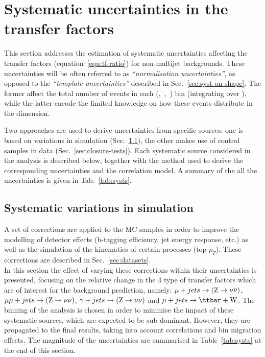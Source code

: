 \clearpage
\section{Systematic uncertainties in the transfer factors}
\label{sec:systematics}

This section addresses the estimation of systematic uncertainties
affecting the transfer factors (equation~\ref{equ:tf-ratio})
for non-multijet backgrounds. 
These uncertainties will be often referred to as \textit{``normalisation uncertainties''}, 
as opposed to the \textit{``template uncertainties''} described in Sec.~\ref{sec:syst-on-shape}. 
The former affect the total number of events in each (\njet,~\nb,~\scalht) bin (integrating over \mht), 
while the latter encode the limited knowledge on how these events distribute in the \mht dimension.

Two approaches are used to derive uncertainties from specific sources:
one is based on variations in simulation (Sec.~\ref{sec:mc-variations}), the other makes use of control samples in data (Sec.~\ref{sec:closure-tests}).
Each systematic source considered in the analysis is described below, 
together with the method used to derive the corresponding uncertainties and the correlation model. 
A summary of the all the uncertainties is given in Tab.~\ref{tab:systs}.

\subsection{Systematic variations in simulation}
\label{sec:mc-variations}

A set of corrections are applied to the MC samples in order to improve the modelling 
of detector effects (b-tagging efficiency, jet energy response, etc.) 
as well as the simulation of the kinematics of certain processes (top $p_{T}$). 
These corrections are described in Sec.~\ref{sec:datasets}. \\
In this section the effect of varying these corrections within their uncertainties is 
presented, focusing on the relative change in the 4 type of transfer factors which are of interest 
for the background prediction, namely: $\mu + jets \rightarrow ({\text Z} \rightarrow \nu\bar{\nu})$,
$\mu\mu + jets \rightarrow ({\text Z} \rightarrow \nu\bar{\nu})$, $\gamma + jets \rightarrow ({\text Z} \rightarrow \nu\bar{\nu})$ and $\mj
\rightarrow \mathrm{\ttbar+W}$. 
The binning of the analysis is chosen in order to minimise the impact of 
these systematic sources, which are expected to be sub-dominant. 
However, they are propagated to the final results, taking into account
correlations and bin migration effects. 
The magnitude of the uncertainties are summarised in Table~\ref{tab:systs} at
the end of this section. 

